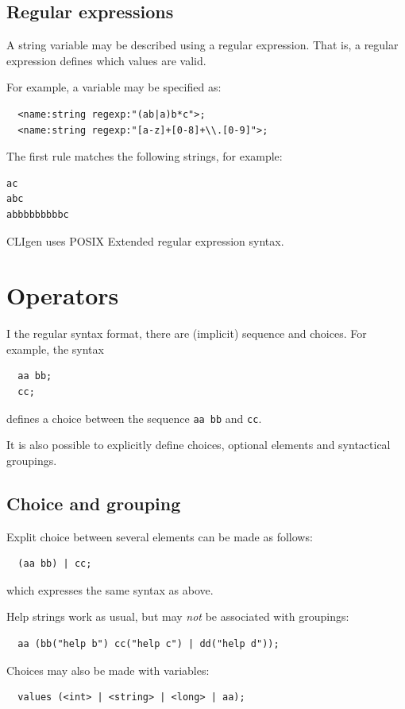 \documentclass[a4paper, 10pt] {article}
\begin{document}
\subsection{Regular expressions}

A string variable may be described using a regular expression. That
is, a regular expression defines which values are valid. 

For example, a variable may be specified as:
\begin{verbatim}
  <name:string regexp:"(ab|a)b*c">;
  <name:string regexp:"[a-z]+[0-8]+\\.[0-9]">;
\end{verbatim}
The first rule matches the following strings, for example:
\begin{verbatim}
ac
abc
abbbbbbbbbc
\end{verbatim}
CLIgen uses POSIX Extended regular expression syntax.

\section{Operators}
\label{sec:operators}

I the regular syntax format, there are (implicit) sequence and choices. For example, the syntax
\begin{verbatim}
  aa bb;
  cc;
\end{verbatim}
defines a choice between the sequence {\tt aa bb} and {\tt cc}.

It is also possible to explicitly define choices, optional elements and syntactical groupings.

\subsection{Choice and grouping}
Explit choice between several elements can be made as follows:
\begin{verbatim}
  (aa bb) | cc;
\end{verbatim}
which expresses the same syntax as above.

Help strings work as usual, but may \emph{not} be associated with
groupings:
\begin{verbatim}
  aa (bb("help b") cc("help c") | dd("help d"));
\end{verbatim}

Choices may also be made with variables:
\begin{verbatim}
  values (<int> | <string> | <long> | aa);
\end{verbatim}
\end{document}

